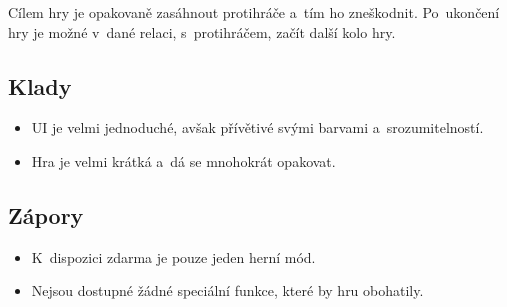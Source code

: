 Cílem hry je opakovaně zasáhnout protihráče a~tím ho zneškodnit.
Po~ukončení hry je možné v~dané relaci, s~protihráčem, začít další kolo hry.

\subsection*{Klady}

\begin{itemize}
    \item UI je velmi jednoduché, avšak přívětivé svými barvami a~srozumitelností.
    \item Hra je velmi krátká a~dá se mnohokrát opakovat.
\end{itemize}

\subsection*{Zápory}

\begin{itemize}
    \item K~dispozici zdarma je pouze jeden herní mód.
    \item Nejsou dostupné žádné speciální funkce, které by hru obohatily.
\end{itemize}
